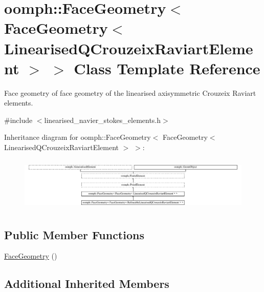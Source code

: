 \hypertarget{classoomph_1_1FaceGeometry_3_01FaceGeometry_3_01LinearisedQCrouzeixRaviartElement_01_4_01_4}{}\section{oomph\+:\+:Face\+Geometry$<$ Face\+Geometry$<$ Linearised\+Q\+Crouzeix\+Raviart\+Element $>$ $>$ Class Template Reference}
\label{classoomph_1_1FaceGeometry_3_01FaceGeometry_3_01LinearisedQCrouzeixRaviartElement_01_4_01_4}


Face geometry of face geometry of the linearised axisymmetric Crouzeix Raviart elements.  




{\ttfamily \#include $<$linearised\+\_\+navier\+\_\+stokes\+\_\+elements.\+h$>$}

Inheritance diagram for oomph\+:\+:Face\+Geometry$<$ Face\+Geometry$<$ Linearised\+Q\+Crouzeix\+Raviart\+Element $>$ $>$\+:\begin{figure}[H]
\begin{center}
\leavevmode
\includegraphics[height=2.592592cm]{classoomph_1_1FaceGeometry_3_01FaceGeometry_3_01LinearisedQCrouzeixRaviartElement_01_4_01_4}
\end{center}
\end{figure}
\subsection*{Public Member Functions}
\begin{DoxyCompactItemize}
\item 
\hyperlink{classoomph_1_1FaceGeometry_3_01FaceGeometry_3_01LinearisedQCrouzeixRaviartElement_01_4_01_4_a75833f93e7e89e54a5c2da853cf25c38}{Face\+Geometry} ()
\end{DoxyCompactItemize}
\subsection*{Additional Inherited Members}



